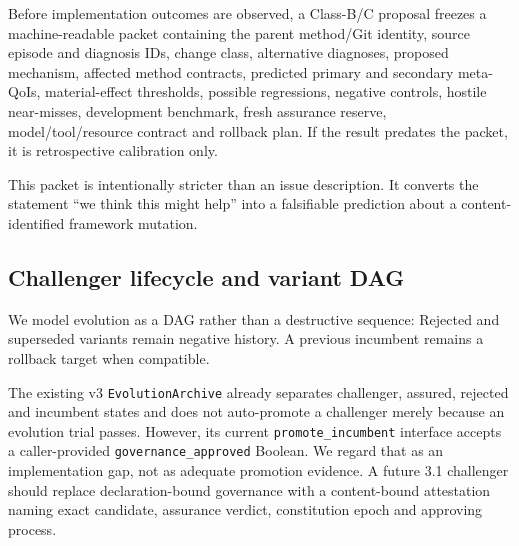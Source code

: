 Before implementation outcomes are observed, a Class-B/C proposal freezes a machine-readable packet containing the parent method/Git identity, source episode and diagnosis IDs, change class, alternative diagnoses, proposed mechanism, affected method contracts, predicted primary and secondary meta-QoIs, material-effect thresholds, possible regressions, negative controls, hostile near-misses, development benchmark, fresh assurance reserve, model/tool/resource contract and rollback plan. If the result predates the packet, it is retrospective calibration only.

This packet is intentionally stricter than an issue description. It converts the statement ``we think this might help'' into a falsifiable prediction about a content-identified framework mutation.

\subsection{Challenger lifecycle and variant DAG}

We model evolution as a DAG rather than a destructive sequence:
Rejected and superseded variants remain negative history. A previous incumbent remains a rollback target when compatible.

The existing v3 \texttt{EvolutionArchive} already separates challenger, assured, rejected and incumbent states and does not auto-promote a challenger merely because an evolution trial passes. However, its current \texttt{promote\_incumbent} interface accepts a caller-provided \texttt{governance\_approved} Boolean. We regard that as an implementation gap, not as adequate promotion evidence. A future 3.1 challenger should replace declaration-bound governance with a content-bound attestation naming exact candidate, assurance verdict, constitution epoch and approving process.


